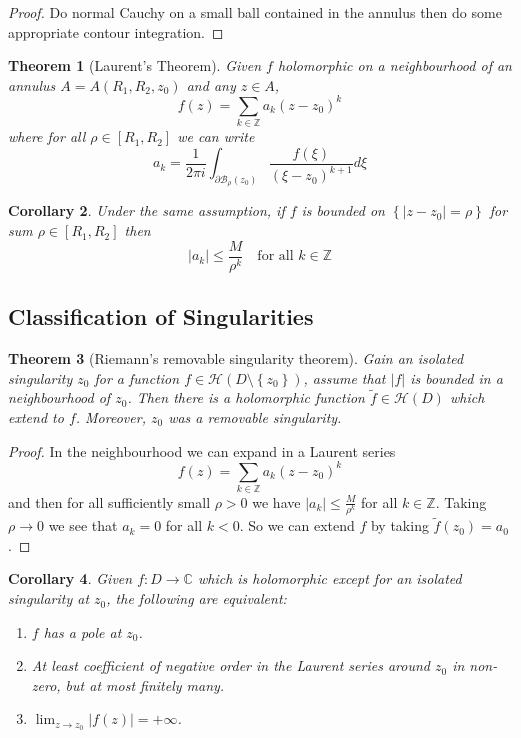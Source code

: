 \documentclass[11pt]{article}
\newcommand{\abs}[1]{|#1|}
\newcommand{\C}{\mathbb{C}}
\newcommand{\Z}{\mathbb{Z}}
\newtheorem{theorem}{Theorem}[section]
\newtheorem{cor}[theorem]{Corollary}
\begin{document}
\begin{proof}
Do normal Cauchy on a small ball contained in the annulus then do some appropriate contour integration.
\end{proof}

\begin{theorem}[Laurent's Theorem]
Given $f$ holomorphic on a neighbourhood of an annulus $A=A(R_1, R_2, z_0)$ and any $z\in A$,
\[
	f(z)=\sum_{k\in\Z}a_k(z-z_0)^k
\]
where for all $\rho\in [R_1, R_2]$ we can write
\[
	a_k=\frac{1}{2\pi i}\int_{\partial \mathcal{B}_{\rho}(z_0)}\frac{f(\xi)}{\left(\xi-z_0\right)^{k+1}}d\xi
\]
\end{theorem}

\begin{cor}
	Under the same assumption, if $f$ is bounded on $\left\{\abs{z-z_0}=\rho\right\}$ for sum $\rho\in[R_1, R_2]$ then
	\[
		\abs{a_k}\leq\frac{M}{\rho^k}\quad\text{for all }k\in\Z
	\]
\end{cor}

\subsection{Classification of Singularities}
\begin{theorem}[Riemann's removable singularity theorem]
Gain an isolated singularity $z_0$ for a function $f\in\mathcal{H}(D\setminus\left\{z_0\right\})$, assume that $\abs{f}$ is bounded in a neighbourhood of $z_0$.
Then there is a holomorphic function $\widetilde{f}\in\mathcal{H}(D)$ which extend to $f$.
Moreover, $z_0$ was a removable singularity.
\end{theorem}

\begin{proof}
In the neighbourhood we can expand in a Laurent series
\[
	f(z)=\sum_{k\in\Z}a_k(z-z_0)^k
\]
and then for all sufficiently small $\rho>0$ we have $\abs{a_k}\leq\frac{M}{\rho^k}$ for all $k\in\Z$.
Taking $\rho\to 0$ we see that $a_k=0$ for all $k<0$.
So we can extend $f$ by taking $\widetilde{f}(z_0)=a_0$.
\end{proof}

\begin{cor}
Given $f:D\to\C$ which is holomorphic except for an isolated singularity at $z_0$, the following are equivalent:
\begin{enumerate}[label=(\roman*)]
	\item $f$ has a pole at $z_0$.
	\item At least coefficient of negative order in the Laurent series around $z_0$ in non-zero, but at most finitely many.
	\item $\lim_{z\to z_0}\abs{f(z)}=+\infty$.
\end{enumerate}
\end{cor}
\end{document}
